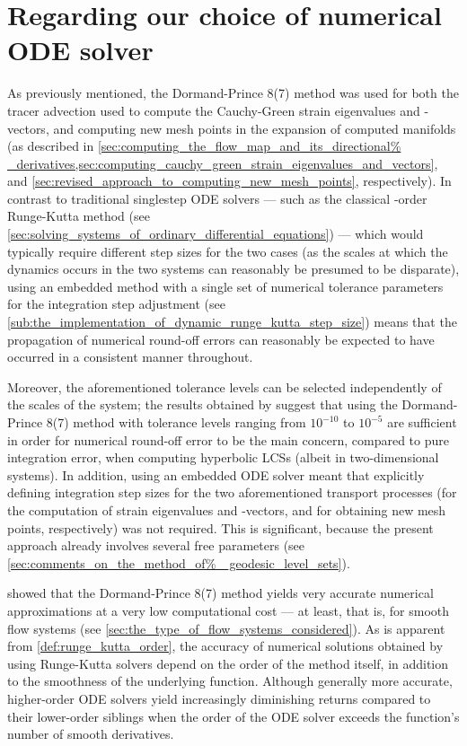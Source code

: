\section{Regarding our choice of numerical ODE solver}
\label{sec:regarding_our_choice_of_numerical_ode_solver}

As previously mentioned, the Dormand-Prince 8(7) method was used for both the
tracer advection used to compute the Cauchy-Green strain eigenvalues and
-vectors, and computing new mesh points in the expansion of computed manifolds
(as described in \cref{sec:computing_the_flow_map_and_its_directional%
_derivatives,sec:computing_cauchy_green_strain_eigenvalues_and_vectors}, and
\cref{sec:revised_approach_to_computing_new_mesh_points}, respectively).
In contrast to traditional singlestep ODE solvers --- such as the classical
-order Runge-Kutta method (see
\cref{sec:solving_systems_of_ordinary_differential_equations}) --- which would
typically require different step sizes for the two cases (as the scales at which
the dynamics occurs in the two systems can reasonably be presumed to be
disparate), using an embedded method with a single set of numerical tolerance
parameters for the integration step adjustment (see
\cref{sub:the_implementation_of_dynamic_runge_kutta_step_size}) means that the
propagation of numerical round-off errors can reasonably be expected to have
occurred in a consistent manner throughout.

Moreover, the aforementioned tolerance levels can be selected independently of
the scales of the system; the results obtained by
\textcite{loken2017sensitivity} suggest that using the Dormand-Prince 8(7)
method with tolerance levels ranging from $10^{-10}$ to $10^{-5}$ are
sufficient in order for numerical round-off error to be the main
concern, compared to pure integration error, when computing hyperbolic LCSs
(albeit in two-dimensional systems). In addition, using an embedded ODE
solver meant that explicitly defining integration step sizes for the
two aforementioned transport processes (for the computation of strain
eigenvalues and -vectors, and for obtaining new mesh points, respectively) was
not required. This is significant, because the present approach already
involves several free parameters (see \cref{sec:comments_on_the_method_of%
_geodesic_level_sets}).

\textcite{loken2017sensitivity} showed that the Dormand-Prince 8(7) method
yields very accurate numerical approximations at a very low computational cost
--- at least, that is, for smooth flow systems (see
\cref{sec:the_type_of_flow_systems_considered}). As is apparent from
\cref{def:runge_kutta_order}, the accuracy of numerical solutions obtained by
using Runge-Kutta solvers depend on the order of the method itself, in addition
to the smoothness of the underlying function. Although generally more accurate,
higher-order ODE solvers yield increasingly diminishing returns compared to
their lower-order siblings when the order of the ODE solver exceeds the
function's number of smooth derivatives.

